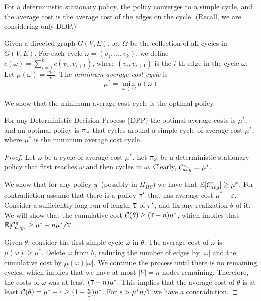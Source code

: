 For a deterministic stationary policy, the policy converges to a
simple cycle, and the average cost is the average cost of the edges
on the cycle. (Recall, we are considering only DDP.)

Given a directed graph $G(V,E)$, let $\Omega$ be the collection of
all cycles in $G(V,E)$. For each cycle $\omega=(v_1, \ldots ,
v_{k})$, we define $c(\omega)=\sum_{i=1}^k c(v_i,v_{i+1})$, where
$(v_i,v_{i+1})$ is the $i$-th edge in the cycle $\omega$. Let
$\mu(\omega)=\frac{c(\omega}{k}$. The {\em minimum average cost cycle}
is
\[
\mu^*=\min_{\omega\in\Omega} \mu(\omega)
\]

We show that the minimum average cost cycle is the optimal policy.
\begin{theorem}
For any Deterministic Decision Process (DPP) the optimal average
costs is $\mu^*$, and an optimal policy is $\pi_{\omega}$ that
cycles around a simple cycle of average cost $\mu^*$, where $\mu^*$ is the minimum average cost cycle.
\end{theorem}

\begin{proof}
Let $\omega$ be a cycle of average cost $\mu^*$. Let
$\pi_{\omega}$ be a deterministic stationary policy that first
reaches $\omega$ and then cycles in $\omega$. Clearly,
$\mathcal{C}^{\pi_\omega}_{avg}=\mu^*$.

We show that for any policy $\pi$ (possibly in $\Pi_{HS})$ we
have that $\mathbb{E}[\mathcal{C}^\pi_{avg}]\geq \mu^*$. For contradiction
assume that there is a policy $\pi'$ that has average cost
$\mu^*-\varepsilon$. Consider a sufficiently long run of length
${\tt T}$ of $\pi'$, and fix any realization $\theta$ of it.
We will show that the cumulative cost $\mathcal{C}(\theta)\geq
({\tt T}-n)\mu^*$, which implies that $\mathbb{E}[\mathcal{C}^\pi_{avg}]\geq
\mu^* -n\mu^*/{\tt T}$.

Given $\theta$, consider the first simple cycle $\omega$ in
$\theta$. The average cost of $\omega$ is $\mu(\omega)\geq\mu^*$.
Delete $\omega$ from $\theta$, reducing the number of edges by
$|\omega|$ and the cumulative cost by $\mu(\omega)|\omega|$. We
continue the process until there is no remaining cycles, which
implies that we have at most $|V|=n$ nodes remaining. Therefore, the
costs of $\omega$ was at least $({\tt T}-n)\mu^*$. This implies
that the average cost of $\theta$ is at least $\mathcal{C}(\theta)=\mu^*-\epsilon\geq
(1-\frac{n}{{\tt T}})\mu^*$. For $\epsilon>\mu^* n/{\tt T}$ we
have a contradiction.
\end{proof}

